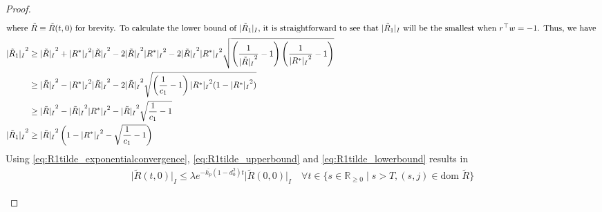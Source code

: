 \documentclass{article}
\newcommand{\dom}{\text{dom }}
\newcommand{\R}[1]{\mathbb{R}^{#1}}
\newcommand{\brackets}[1]{\left(#1\right)}
\newcommand{\Rtilde}{\tilde{R}}
\newcommand{\normSOthree}[1]{{{\vert}#1 {\vert}_I}}
\newcommand{\expo}[1]{e^{#1}}
\newcommand{\Rstar}{{R^*}}
\begin{document}
\begin{proof}
\begin{align}
    \intertext{where $\Rtilde \equiv \Rtilde(t,0)$ for brevity. To calculate the lower bound of $\normSOthree{\Rtilde_1}$, it is straightforward to see that $\normSOthree{\Rtilde_1}$ will be the smallest when $r^\top w = -1$. Thus, we have }
    \normSOthree{\Rtilde_1}^2 &\geq \normSOthree{\Rtilde}^2 + \normSOthree{\Rstar}^2\normSOthree{\Rtilde}^2 - 2\normSOthree{\Rtilde}^2\normSOthree{\Rstar}^2 - 2\normSOthree{\Rtilde}^2\normSOthree{\Rstar}^2\sqrt{\brackets{\frac{1}{\normSOthree{\Rtilde}^2}-1}\brackets{\frac{1}{\normSOthree{\Rstar}^2}-1}}\nonumber\\
    &\geq \normSOthree{\Rtilde}^2 - \normSOthree{\Rstar}^2\normSOthree{\Rtilde}^2 - 2\normSOthree{\Rtilde}^2\sqrt{\brackets{\frac{1}{c_1}-1}{\normSOthree{\Rstar}^2(1 - \normSOthree{\Rstar}^2)}} \nonumber\\
    &\geq \normSOthree{\Rtilde}^2 - \normSOthree{\Rtilde}^2\normSOthree{\Rstar}^2 - \normSOthree{\Rtilde}^2\sqrt{\frac{1}{c_1}-1} \nonumber\\
    \normSOthree{\Rtilde_1}^2 &\geq \normSOthree{\Rtilde}^2\brackets{1 - \normSOthree{\Rstar}^2 - \sqrt{\frac{1}{c_1}-1}} \label{eq:R1tilde_lowerbound}
\end{align}
Using \eqref{eq:R1tilde_exponentialconvergence}, \eqref{eq:R1tilde_upperbound} and \eqref{eq:R1tilde_lowerbound} results in
\begin{align}\label{eq:eq20}
    \normSOthree{\Rtilde(t,0)} \leq \lambda \expo{-\overline{k_p}(1-d_0^2)t}\normSOthree{\Rtilde(0,0)} \quad \forall t\in \{s\in\R{}_{\geq 0} \mid s > T, (s,j)\in \dom\Rtilde\}
\end{align}
\begin{flushleft}

\end{flushleft}
\end{proof}
\end{document}
